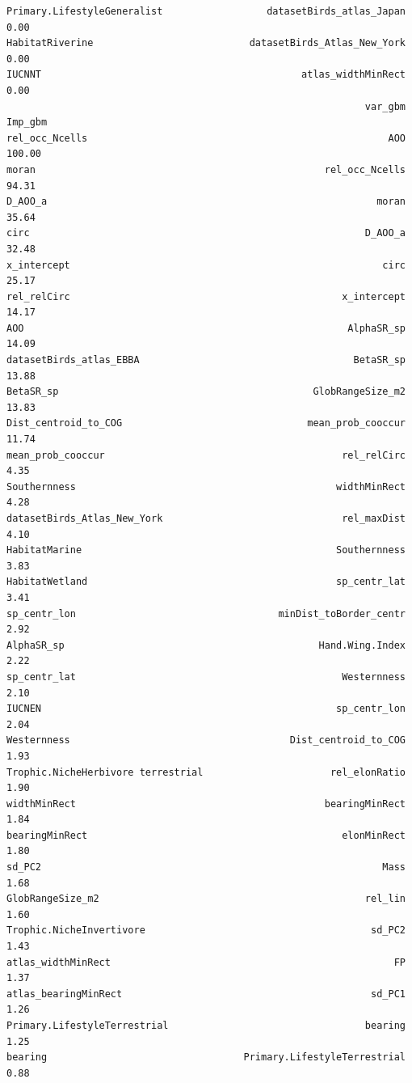 \documentclass[
  letterpaper,
  DIV=11,
  numbers=noendperiod]{scrreprt}
\begin{document}
\begin{verbatim}
Primary.LifestyleGeneralist                  datasetBirds_atlas_Japan    0.00
HabitatRiverine                           datasetBirds_Atlas_New_York    0.00
IUCNNT                                             atlas_widthMinRect    0.00
                                                              var_gbm Imp_gbm
rel_occ_Ncells                                                    AOO  100.00
moran                                                  rel_occ_Ncells   94.31
D_AOO_a                                                         moran   35.64
circ                                                          D_AOO_a   32.48
x_intercept                                                      circ   25.17
rel_relCirc                                               x_intercept   14.17
AOO                                                        AlphaSR_sp   14.09
datasetBirds_atlas_EBBA                                     BetaSR_sp   13.88
BetaSR_sp                                            GlobRangeSize_m2   13.83
Dist_centroid_to_COG                                mean_prob_cooccur   11.74
mean_prob_cooccur                                         rel_relCirc    4.35
Southernness                                             widthMinRect    4.28
datasetBirds_Atlas_New_York                               rel_maxDist    4.10
HabitatMarine                                            Southernness    3.83
HabitatWetland                                           sp_centr_lat    3.41
sp_centr_lon                                   minDist_toBorder_centr    2.92
AlphaSR_sp                                            Hand.Wing.Index    2.22
sp_centr_lat                                              Westernness    2.10
IUCNEN                                                   sp_centr_lon    2.04
Westernness                                      Dist_centroid_to_COG    1.93
Trophic.NicheHerbivore terrestrial                      rel_elonRatio    1.90
widthMinRect                                           bearingMinRect    1.84
bearingMinRect                                            elonMinRect    1.80
sd_PC2                                                           Mass    1.68
GlobRangeSize_m2                                              rel_lin    1.60
Trophic.NicheInvertivore                                       sd_PC2    1.43
atlas_widthMinRect                                                 FP    1.37
atlas_bearingMinRect                                           sd_PC1    1.26
Primary.LifestyleTerrestrial                                  bearing    1.25
bearing                                  Primary.LifestyleTerrestrial    0.88

\end{verbatim}
\end{document}
